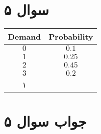 \section*{سوال ۵}

\begin{table}
	\centering
	\begin{tabular}{|c|c|}
		\arrayrulecolor{blue}\hline
		\textbf{Demand} & \textbf{Probability} \\
		\hline
		$0$ & $0.1$ \\
		\hline
		$1$ & $0.25$ \\
		\hline
		$2$ & $0.45$ \\
		\hline
		$3$ & $0.2$ \\
		\hline
۱‍		\end{tabular}
\end{table}

\section*{جواب سوال ۵}
